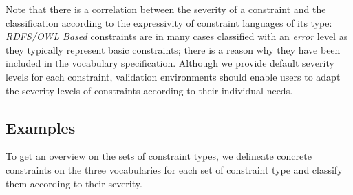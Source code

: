 \documentclass[conference]{IEEEtran}
\newcommand{\ke}[1]{\todo[size=\small, color=red!40]{\textbf{Kai:} #1}}
\newcommand{\tb}[1]{\todo[size=\small, color=green!40]{\textbf{Thomas:} #1}}
\begin{document}
Note that there is a correlation between the severity of a constraint and the classification according to the expressivity of constraint languages of its type: \emph{RDFS/OWL Based} constraints are in many cases classified with an \emph{error} level as they typically represent basic constraints; there is a reason why they have been included in the vocabulary specification. Although we provide default severity levels for each constraint, validation environments should enable users to adapt the severity levels of constraints according to their individual needs.

%
%
%

%


\subsection{Examples}
\label{vocabulary-constraint-types}

To get an overview on the sets of constraint types, we delineate concrete constraints on the three vocabularies for each set of constraint type and classify them according to their severity.
\end{document}
